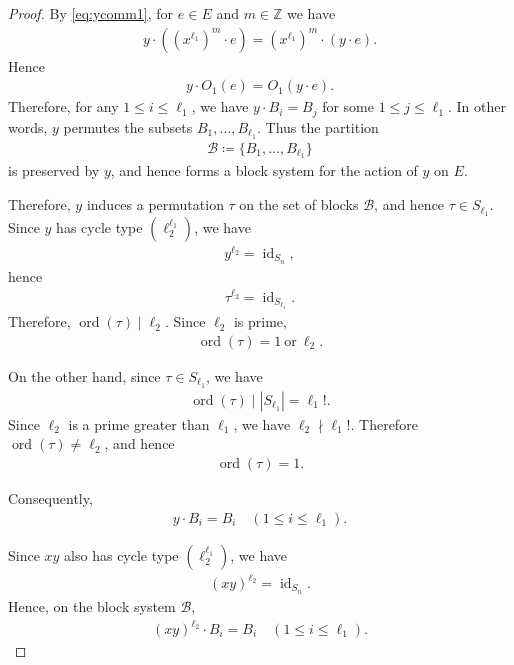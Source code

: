 \documentclass[12pt,reqno]{amsart}
\newcommand{\mcB}{\mathcal{B}}
\newcommand{\Z}{\mathbb{Z}}								%
\newcommand{\q}{\quad}									%
\newcommand{\ceq}{\coloneqq} 							%
\DeclareMathOperator{\id}{id}								%
\DeclareMathOperator{\ord}{ord}							%
\theoremstyle{mythmstyle}
\theoremstyle{mydefstyle}
\numberwithin{equation}{section}
\begin{document}
\begin{proof}
By \eqref{eq:ycomm1}, for $e \in E$ and $m \in \Z$ we have
\begin{align}
y\cdot((x^{\ell_1})^m\cdot e) = (x^{\ell_1})^m\cdot(y\cdot e).
\end{align}
Hence
\begin{align}
y\cdot O_{1}(e) = O_{1}(y \cdot e).
\end{align}
Therefore, for any $1 \le i \le \ell_{1}$, we have
$y\cdot B_i=B_j$ for some $1\le j\le \ell_1$.
In other words, $y$ permutes the subsets
$B_1,\dots,B_{\ell_1}$.
Thus the partition
\begin{align}
\mcB \ceq \{B_1,\dots,B_{\ell_1}\}
\end{align}
is preserved by $y$, and hence forms a block system for the action of $y$ on $E$.

Therefore, $y$ induces a permutation $\tau$ on the set of blocks $\mcB$, and hence
$\tau \in S_{\ell_{1}}$.
Since $y$ has cycle type $(\ell_{2}^{\ell_{1}})$, we have
\begin{align}
y^{\ell_{2}} = \id_{S_{n}},
\end{align}
hence
\begin{align}
\tau^{\ell_{2}} = \id_{S_{\ell_{1}}}.
\end{align}
Therefore, $\ord(\tau)\mid \ell_2$. Since $\ell_2$ is prime,
\begin{align}
\label{eq:tau2}
\ord(\tau) = 1\ \text{or}\ \ell_{2}.
\end{align}

On the other hand, since $\tau\in S_{\ell_1}$, we have
\begin{align}
\ord(\tau)\mid |S_{\ell_1}|=\ell_1!.
\end{align}
Since $\ell_2$ is a prime greater than $\ell_1$,
we have $\ell_2\nmid\ell_1!$.
Therefore $\ord(\tau)\ne\ell_2$, and hence
\begin{align}
\ord(\tau)=1.
\end{align}

Consequently,
\begin{align}
\label{eq:yblock}
y\cdot B_{i} = B_{i}\q(1 \le i \le \ell_{1}).
\end{align}

Since $xy$ also has cycle type $(\ell_{2}^{\ell_{1}})$, we have
\begin{align}
(xy)^{\ell_{2}} = \id_{S_{n}}.
\end{align}
Hence, on the block system $\mcB$,
\begin{align}
\label{eq:xyblock1}
(xy)^{\ell_{2}}\cdot B_{i} = B_{i}\q(1 \le i \le \ell_{1}).
\end{align}


\end{proof}
\end{document}
